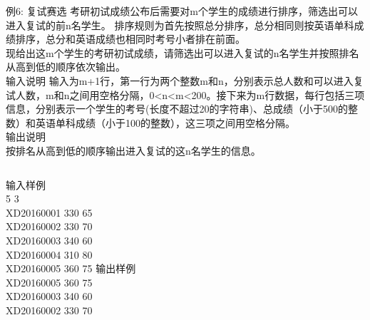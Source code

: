 
\begin{frame}{例6: 复试赛选}
考研初试成绩公布后需要对m个学生的成绩进行排序，筛选出可以进入复试的前n名学生。
排序规则为首先按照总分排序，总分相同则按英语单科成绩排序，总分和英语成绩也相同时考号小者排在前面。\\
现给出这m个学生的考研初试成绩，请筛选出可以进入复试的n名学生并按照排名从高到低的顺序依次输出。\\
输入说明	
输入为m+1行，第一行为两个整数m和n，分别表示总人数和可以进入复试人数，m和n之间用空格分隔，0<n<m<200。接下来为m行数据，每行包括三项信息，分别表示一个学生的考号(长度不超过20的字符串)、总成绩（小于500的整数）和英语单科成绩（小于100的整数），这三项之间用空格分隔。\\
输出说明\\	
按排名从高到低的顺序输出进入复试的这n名学生的信息。\\
\begin{columns}[T]
输入样例\\	
5 3\\
XD20160001 330 65\\
XD20160002 330 70\\
XD20160003 340 60\\
XD20160004 310 80\\
XD20160005 360 75
输出样例\\	
XD20160005 360 75\\
XD20160003 340 60\\
XD20160002 330 70
\end{columns}
\medskip
\end{frame}

